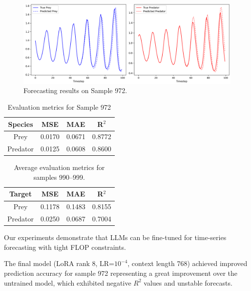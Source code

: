 \documentclass[a4paper,12pt]{article}
\begin{document}
\begin{figure}[H]
    \centering
    \includegraphics[width=0.95\linewidth]{sample972_trained.png}
    \caption{Forecasting results on Sample 972.}
    \label{fig:sample_prediction}
\end{figure}

\begin{table}[H]
    \centering

    \begin{tabular}{|c|c|c|c|}
        \hline
        \textbf{Species} & \textbf{MSE} & \textbf{MAE} & \textbf{R$^2$} \\
        \hline
        Prey & 0.0170 & 0.0671 & 0.8772 \\
        Predator & 0.0125 & 0.0608 & 0.8600 \\
        \hline
    \end{tabular}
    \vspace{0.2cm}
    \caption{Evaluation metrics for Sample 972}
    \label{tab:metrics_sample972}
\end{table}

\begin{table}[H]
  \centering
  \begin{tabular}{|c|c|c|c|}
      \hline
      \textbf{Target} & \textbf{MSE} & \textbf{MAE} & \textbf{R$^2$} \\
      \hline
      Prey & 0.1178 & 0.1483 & 0.8155 \\
      Predator & 0.0250 & 0.0687 & 0.7004 \\
      \hline
  \end{tabular}
  \vspace{0.2cm}
  \caption{Average evaluation metrics for samples 990–999.}
  \label{tab:avg_metrics_990_999}
  \end{table}

  Our experiments demonstrate that LLMs can be fine-tuned for time-series forecasting with tight FLOP constraints.
  
  The final model (LoRA rank 8, LR=$10^{-4}$, context length 768) achieved improved prediction accuracy for sample 972 representing a great improvement over the untrained model, which exhibited negative $R^2$ values and unstable forecasts.
  
\end{document}
